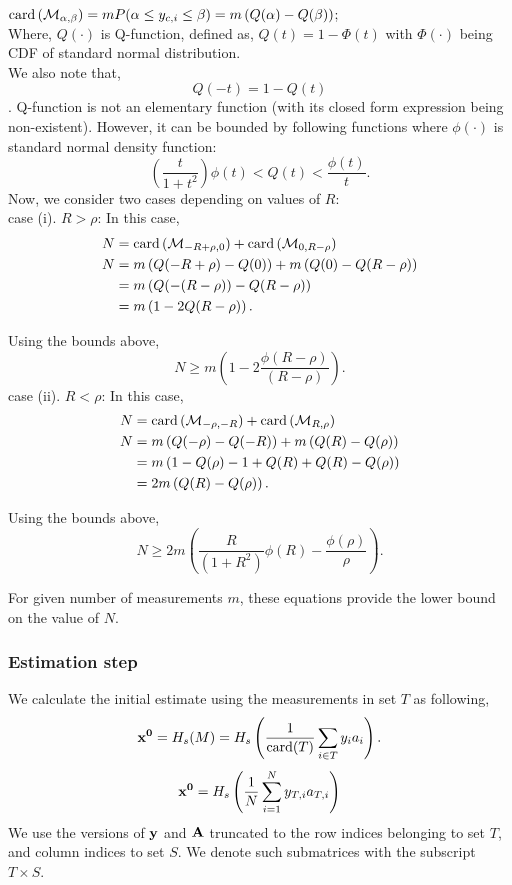  $\mathrm{card}\left(\mathcal{M}_{\alpha,\beta}\right)=mP(\alpha \leq y_{c,i}\leq \beta) = m\left(Q(\alpha)- Q(\beta)\right)$; \\
Where, $Q(\cdot)$ is Q-function, defined as, $Q(t) = 1-\Phi(t)$ with $\Phi(\cdot)$ being CDF of standard normal distribution. \\
We also note that,
 $$Q(-t) = 1 - Q(t)$$.
Q-function is not an elementary function (with its closed form expression being non-existent). However, it can be bounded by following functions where $\phi(\cdot)$ is standard normal density function:
$$
\left(\frac{t}{1+t^2}\right)\phi(t) < Q(t) < \frac{\phi(t)}{t}.
$$
Now, we consider two cases depending on values of $R$: \\
case (i). $R > \rho$: In this case,
\begin{align}
N & = \mathrm{card}\left(\mathcal{M}_{-R + \rho,0}\right) + \mathrm{card}\left(\mathcal{M}_{0, R-\rho}\right) \nonumber \\
N &  = m\left(Q(-R+\rho)- Q(0)\right) + m\left(Q(0)- Q(R-\rho)\right) \nonumber \\
& = m\left(Q(-(R-\rho))- Q(R-\rho)\right) \nonumber \\
& = m\left(1-2Q(R-\rho)\right).
\end{align}

Using the bounds above,
$$
N \geq m \left(1-2\frac{\phi(R-\rho)}{(R-\rho)} \right).
$$
\noindent case (ii). $R < \rho$: In this case,
\begin{align}
N & = \mathrm{card}\left(\mathcal{M}_{-\rho,-R}\right) + \mathrm{card}\left(\mathcal{M}_{R,\rho}\right) \nonumber \\
N & = m\left(Q(-\rho)- Q(-R)\right) + m\left(Q(R)- Q(\rho)\right) \nonumber \\
& = m\left(1 - Q(\rho)-1 +Q(R) +Q(R) -Q(\rho)\right) \nonumber \\
& = 2m\left(Q(R)-Q(\rho)\right).
\end{align}

Using the bounds above,
$$
N \geq 2m \left(\frac{R}{(1+R^2)} \phi(R) - \frac{\phi(\rho)}{\rho}\right).
$$

For given number of measurements $m$, these equations provide the lower bound on the value of $N$.
\subsubsection{Estimation step}

We calculate the initial estimate using the measurements in set $T$ as following,
$$
\mathbf{{x}^0} = H_s(M) = H_s\left(\frac{1}{\mathrm{card}(T)}\sum_{i\in T}y_{i}a_{i}\right).
$$
$$
\mathbf{x^0} = H_s\left( \frac{1}{N}\sum_{i=1}^{N}y_{T,i}a_{T,i}\right)
$$
We use the versions of $\mathbf{y}$ and $\mathbf{A}$ truncated to the row indices belonging to set $T$, and column indices to set $S$. We denote such submatrices with the subscript $T\times S$. 

